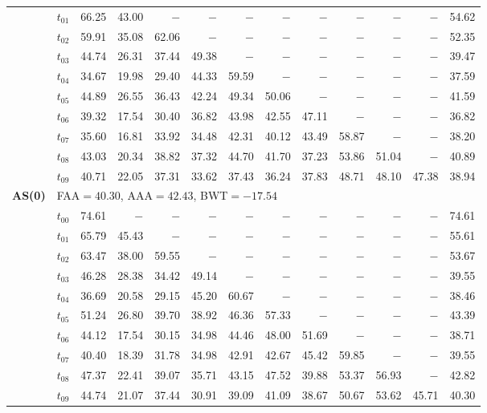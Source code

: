\begin{table}[ht]
\begin{tabular}{@{}l l r r r r r r r r r r r@{}}
 & $t_{01}$ & 66.25 & 43.00 & $-$ & $-$ & $-$ & $-$ & $-$ & $-$ & $-$ & $-$ & 54.62 \\
 & $t_{02}$ & 59.91 & 35.08 & 62.06 & $-$ & $-$ & $-$ & $-$ & $-$ & $-$ & $-$ & 52.35 \\
 & $t_{03}$ & 44.74 & 26.31 & 37.44 & 49.38 & $-$ & $-$ & $-$ & $-$ & $-$ & $-$ & 39.47 \\
 & $t_{04}$ & 34.67 & 19.98 & 29.40 & 44.33 & 59.59 & $-$ & $-$ & $-$ & $-$ & $-$ & 37.59 \\
 & $t_{05}$ & 44.89 & 26.55 & 36.43 & 42.24 & 49.34 & 50.06 & $-$ & $-$ & $-$ & $-$ & 41.59 \\
 & $t_{06}$ & 39.32 & 17.54 & 30.40 & 36.82 & 43.98 & 42.55 & 47.11 & $-$ & $-$ & $-$ & 36.82 \\
 & $t_{07}$ & 35.60 & 16.81 & 33.92 & 34.48 & 42.31 & 40.12 & 43.49 & 58.87 & $-$ & $-$ & 38.20 \\
 & $t_{08}$ & 43.03 & 20.34 & 38.82 & 37.32 & 44.70 & 41.70 & 37.23 & 53.86 & 51.04 & $-$ & 40.89 \\
 & $t_{09}$ & 40.71 & 22.05 & 37.31 & 33.62 & 37.43 & 36.24 & 37.83 & 48.71 & 48.10 & 47.38 & 38.94 \\
\midrule
\multirow{11}{*}{\textbf{AS(0)}} & \multicolumn{12}{l}{\quad\small FAA$=40.30$,\; AAA$=42.43$,\; BWT$=-17.54$} \\
 & $t_{00}$ & 74.61 & $-$ & $-$ & $-$ & $-$ & $-$ & $-$ & $-$ & $-$ & $-$ & 74.61 \\
 & $t_{01}$ & 65.79 & 45.43 & $-$ & $-$ & $-$ & $-$ & $-$ & $-$ & $-$ & $-$ & 55.61 \\
 & $t_{02}$ & 63.47 & 38.00 & 59.55 & $-$ & $-$ & $-$ & $-$ & $-$ & $-$ & $-$ & 53.67 \\
 & $t_{03}$ & 46.28 & 28.38 & 34.42 & 49.14 & $-$ & $-$ & $-$ & $-$ & $-$ & $-$ & 39.55 \\
 & $t_{04}$ & 36.69 & 20.58 & 29.15 & 45.20 & 60.67 & $-$ & $-$ & $-$ & $-$ & $-$ & 38.46 \\
 & $t_{05}$ & 51.24 & 26.80 & 39.70 & 38.92 & 46.36 & 57.33 & $-$ & $-$ & $-$ & $-$ & 43.39 \\
 & $t_{06}$ & 44.12 & 17.54 & 30.15 & 34.98 & 44.46 & 48.00 & 51.69 & $-$ & $-$ & $-$ & 38.71 \\
 & $t_{07}$ & 40.40 & 18.39 & 31.78 & 34.98 & 42.91 & 42.67 & 45.42 & 59.85 & $-$ & $-$ & 39.55 \\
 & $t_{08}$ & 47.37 & 22.41 & 39.07 & 35.71 & 43.15 & 47.52 & 39.88 & 53.37 & 56.93 & $-$ & 42.82 \\
 & $t_{09}$ & 44.74 & 21.07 & 37.44 & 30.91 & 39.09 & 41.09 & 38.67 & 50.67 & 53.62 & 45.71 & 40.30 \\

\end{tabular}
\end{table}
